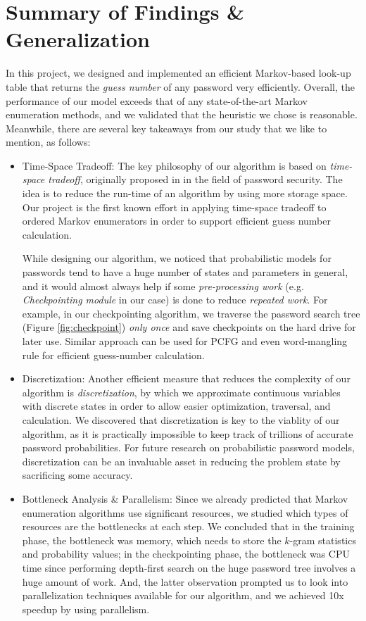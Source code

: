 \documentclass{article} %
\theoremstyle{definition}
\theoremstyle{theorem}
\theoremstyle{remark}
\theoremstyle{remark}
\begin{document}
\section{Summary of Findings \& Generalization}
\par\quad In this project, we designed and implemented an efficient Markov-based look-up table that returns the \emph{guess number} of any password very efficiently. Overall, the performance of our model exceeds that of any state-of-the-art Markov enumeration methods, and we validated that the heuristic we chose is reasonable. Meanwhile, there are several key takeaways from our study that we like to mention, as follows:
\begin{itemize}
    \item Time-Space Tradeoff: The key philosophy of our algorithm is based on \emph{time-space tradeoff}, originally proposed in \cite{timespace} in the field of password security. The idea is to reduce the run-time of an algorithm by using more storage space. Our project is the first known effort in applying time-space tradeoff to ordered Markov enumerators in order to support efficient guess number calculation.
    \vskip 2pt
    \par While designing our algorithm, we noticed that probabilistic models for passwords tend to have a huge number of states and parameters in general, and it would almost always help if some \emph{pre-processing work} (e.g. \emph{Checkpointing module} in our case) is done to reduce \emph{repeated work}. For example, in our checkpointing algorithm, we traverse the password search tree (Figure \ref{fig:checkpoint}) \emph{only once} and save checkpoints on the hard drive for later use. Similar approach can be used for PCFG and even word-mangling rule for efficient guess-number calculation.
    
    \item Discretization: Another efficient measure that reduces the complexity of our algorithm is \emph{discretization}, by which we approximate continuous variables with discrete states in order to allow easier optimization, traversal, and calculation. We discovered that discretization is key to the viablity of our algorithm, as it is practically impossible to keep track of trillions of accurate password probabilities. For future research on probabilistic password models, discretization can be an invaluable asset in reducing the problem state by sacrificing some accuracy.
    
    \item Bottleneck Analysis \& Parallelism: Since we already predicted that Markov enumeration algorithms use significant resources, we studied which types of resources are the bottlenecks at each step. We concluded that in the training phase, the bottleneck was memory, which needs to store the $k$-gram statistics and probability values; in the checkpointing phase, the bottleneck was CPU time since performing depth-first search on the huge password tree involves a huge amount of work. And, the latter observation prompted us to look into parallelization techniques available for our algorithm, and we achieved 10x speedup by using parallelism.

\end{itemize}
\end{document}
